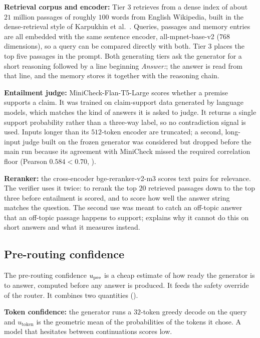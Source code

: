 \textbf{Retrieval corpus and encoder:} Tier 3 retrieves from a dense index of about $21$ million passages of roughly $100$ words from English Wikipedia, built in the dense-retrieval style of Karpukhin et al.~\cite{karpukhin-etal-2020-dense}. Queries, passages and memory entries are all embedded with the same sentence encoder, all-mpnet-base-v2 \cite{reimers-gurevych-2019-sentence} ($768$ dimensions), so a query can be compared directly with both. Tier 3 places the top five passages in the prompt. Both generating tiers ask the generator for a short reasoning followed by a line beginning \emph{Answer:}; the answer is read from that line, and the memory stores it together with the reasoning chain.

\textbf{Entailment judge:} MiniCheck-Flan-T5-Large \cite{tang2024minicheck} scores whether a premise supports a claim. It was trained on claim-support data generated by language models, which matches the kind of answers it is asked to judge. It returns a single support probability rather than a three-way label, so no contradiction signal is used. Inputs longer than its $512$-token encoder are truncated; a second, long-input judge built on the frozen generator was considered but dropped before the main run because its agreement with MiniCheck missed the required correlation floor (Pearson $0.584 < 0.70$, ).

\textbf{Reranker:} the cross-encoder bge-reranker-v2-m3 scores text pairs for relevance. The verifier uses it twice: to rerank the top $20$ retrieved passages down to the top three before entailment is scored, and to score how well the answer string matches the question. The second use was meant to catch an off-topic answer that an off-topic passage happens to support;  explains why it cannot do this on short answers and what it measures instead.

\subsection{Pre-routing confidence}
\label{sec:pre-routing}

The pre-routing confidence $u_{\text{pre}}$ is a cheap estimate of how ready the generator is to answer, computed before any answer is produced. It feeds the safety override of the router. It combines two quantities ().

\textbf{Token confidence:} the generator runs a $32$-token greedy decode on the query and $u_{\text{token}}$ is the geometric mean of the probabilities of the tokens it chose. A model that hesitates between continuations scores low.

